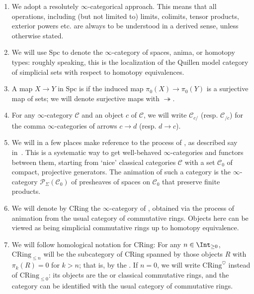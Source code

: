 \documentclass[10pt]{amsart}
\begin{document}
\begin{enumerate}
  \item We adopt a resolutely $\infty$-categorical approach. This means that all operations, including (but not limited to) limits, colimits, tensor products, exterior powers etc. are always to be understood in a derived sense, unless otherwise stated. 


  \item We will use $\mathrm{Spc}$ to denote the $\infty$-category of spaces, anima, or homotopy types: roughly speaking, this is the localization of the Quillen model category of simplicial sets with respect to homotopy equivalences.

  \item A map $X\to Y$ in $\mathrm{Spc}$ is  if the induced map $\pi_0(X)\to \pi_0(Y)$ is a surjective map of sets; we will denote surjective maps with $\twoheadrightarrow$.

  \item For any $\infty$-category $\mathcal{C}$ and an object $c$ of $\mathcal{C}$, we will write $\mathcal{C}_{c/}$ (resp. $\mathcal{C}_{/c}$) for the comma $\infty$-categories of arrows $c\to d$ (resp. $d\to c$).
 
  \item We will in a few places make reference to the process of , as described say in~\cite[Appendix A]{Mao2021-jt}. This is a systematic way to get well-behaved $\infty$-categories and functors between them, starting from `nice' classical categories $\mathcal{C}$ with a set $\mathcal{C}_0$ of compact, projective generators. The animation of such a category is the $\infty$-category $\mathcal{P}_{\Sigma}(\mathcal{C}_0)$ of presheaves of spaces on $\mathcal{C}_0$ that preserve finite products.

  \item We will denote by $\mathrm{CRing}$ the $\infty$-category of , obtained via the process of animation from the usual category of commutative rings. Objects here can be viewed as being simplicial commutative rings up to homotopy equivalence.

  \item We will follow homological notation for $\mathrm{CRing}$: For any $n\in \Int_{\ge 0}$, $\mathrm{CRing}_{\leq n}$ will be the subcategory of $\mathrm{CRing}$ spanned by those objects $R$ with $\pi_k(R) = 0$ for $k>n$; that is, by the . If $n = 0$, we will write $\mathrm{CRing}^{\heartsuit}$ instead of $\mathrm{CRing}_{\leq 0}$: its objects are the  or classical commutative rings, and the category can be identified with the usual category of commutative rings. 


\end{enumerate}
\end{document}
